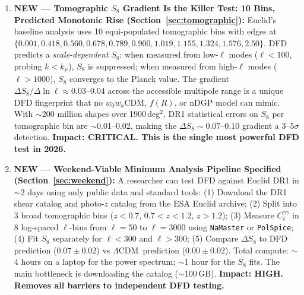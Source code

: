 \documentclass[11pt,a4paper]{article}
\newcommand{\LCDM}{$\Lambda$CDM}
\newcommand{\kmu}{k_\mu}
\begin{document}
\begin{findbox}
\begin{enumerate}
\item \textbf{NEW --- Tomographic $S_8$ Gradient Is the Killer Test:
  10 Bins, Predicted Monotonic Rise (Section~\ref{sec:tomographic}):}
  Euclid's baseline analysis uses 10 equi-populated tomographic bins with
  edges at $\{0.001, 0.418, 0.560, 0.678, 0.789, 0.900, 1.019, 1.155,
  1.324, 1.576, 2.50\}$. DFD predicts a \emph{scale-dependent} $S_8$:
  when measured from low-$\ell$ modes ($\ell < 100$, probing $k < \kmu$),
  $S_8$ is suppressed; when measured from high-$\ell$ modes
  ($\ell > 1000$), $S_8$ converges to the Planck value. The gradient
  $\Delta S_8 / \Delta \ln \ell \approx 0.03$--$0.04$ across the
  accessible multipole range is a unique DFD fingerprint that no
  $w_0 w_a$CDM, $f(R)$, or nDGP model can mimic. With
  $\sim$200 million shapes over 1900\,deg$^2$, DR1 statistical errors
  on $S_8$ per tomographic bin are $\sim$0.01--0.02, making the
  $\Delta S_8 \sim 0.07$--$0.10$ gradient a $3$--$5\sigma$ detection.
  \textbf{Impact: CRITICAL. This is the single most powerful DFD test
  in 2026.}

\item \textbf{NEW --- Weekend-Viable Minimum Analysis Pipeline Specified
  (Section~\ref{sec:weekend}):}
  A researcher can test DFD against Euclid DR1 in $\sim$2 days using
  only public data and standard tools:
  (1) Download the DR1 shear catalog and photo-$z$ catalog from
  the ESA Euclid archive;
  (2) Split into 3 broad tomographic bins ($z < 0.7$, $0.7 < z < 1.2$,
  $z > 1.2$);
  (3) Measure $C_\ell^{\gamma\gamma}$ in 8 log-spaced $\ell$-bins
  from $\ell = 50$ to $\ell = 3000$ using \texttt{NaMaster} or
  \texttt{PolSpice};
  (4) Fit $S_8$ separately for $\ell < 300$ and $\ell > 300$;
  (5) Compare $\Delta S_8$ to DFD prediction ($0.07 \pm 0.02$) vs
  \LCDM\ prediction ($0.00 \pm 0.02$).
  Total compute: $\sim$4 hours on a laptop for the power spectrum;
  $\sim$1 hour for the $S_8$ fits. The main bottleneck is downloading
  the catalog ($\sim$100\,GB).
  \textbf{Impact: HIGH. Removes all barriers to independent DFD testing.}


\end{enumerate}
\end{findbox}
\end{document}
